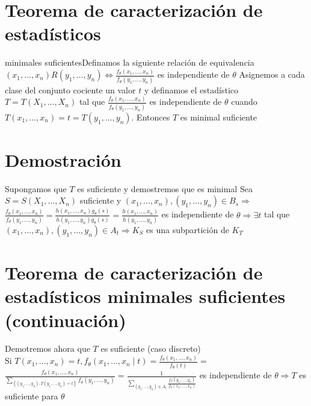 \section*{Teorema de caracterización de estadísticos}
 minimales suficientesDefinamos la siguiente relación de equivalencia $\left(x_{1}, \ldots, x_{n}\right) R\left(y_{1}, \ldots, y_{n}\right) \Leftrightarrow \frac{f_{\theta}\left(x_{1}, \ldots, x_{n}\right)}{f_{\theta}\left(y_{1}, \ldots, y_{n}\right)}$ es independiente de $\theta$ Asignemos a cada clase del conjunto cociente un valor $t$ y definamos el estadístico $T=T\left(X_{1}, \ldots, X_{n}\right)$ tal que $\frac{f_{\theta}\left(x_{1}, \ldots, x_{n}\right)}{f_{\theta}\left(y_{1}, \ldots, y_{n}\right)}$ es independiente de $\theta$ cuando $T\left(x_{1}, \ldots, x_{n}\right)=t=T\left(y_{1}, \ldots, y_{n}\right)$. Entonces $T$ es minimal suficiente

\section*{Demostración}
Supongamos que $T$ es suficiente y demostremos que es minimal Sea $S=S\left(X_{1}, \ldots, X_{n}\right)$ suficiente y $\left(x_{1}, \ldots, x_{n}\right),\left(y_{1}, \ldots, y_{n}\right) \in B_{s} \Rightarrow$ $\frac{f_{\theta}\left(x_{1}, \ldots, x_{n}\right)}{f_{\theta}\left(y_{1}, \ldots, y_{n}\right)}=\frac{h\left(x_{1}, \ldots, x_{n}\right) g_{\theta}(s)}{h\left(y_{1}, \ldots, y_{n}\right) g_{\theta}(s)}=\frac{h\left(x_{1}, \ldots, x_{n}\right)}{h\left(y_{1}, \ldots, y_{n}\right)}$ es independiente de $\theta \Rightarrow \exists t$ tal que $\left(x_{1}, \ldots, x_{n}\right),\left(y_{1}, \ldots, y_{n}\right) \in A_{t} \Rightarrow K_{S}$ es una subpartición de $K_{T}$

\section*{Teorema de caracterización de estadísticos minimales suficientes (continuación)}
Demotremos ahora que $T$ es suficiente (caso discreto)\\
Si $T\left(x_{1}, \ldots, x_{n}\right)=t, f_{\theta}\left(x_{1}, \ldots, x_{n} \mid t\right)=\frac{f_{\theta}\left(x_{1}, \ldots, x_{n}\right)}{f_{\theta}(t)}=$\\
$\frac{f_{\theta}\left(x_{1}, \ldots, x_{n}\right)}{\sum_{\left\{\left(y_{1}, \ldots, y_{n}\right): T\left(y_{1}, \ldots, y_{n}\right)=t\right\}} f_{\theta}\left(y_{1}, \ldots, y_{n}\right)}=\frac{1}{\sum_{\left(y_{1}, \ldots, y_{n}\right) \in A_{t}} \frac{f_{\theta}\left(y_{1}, \ldots, y_{n}\right)}{f_{\theta}\left(x_{1}, \ldots, x_{n}\right)}}$ es independiente de $\theta \Rightarrow T$ es suficiente para $\theta$

